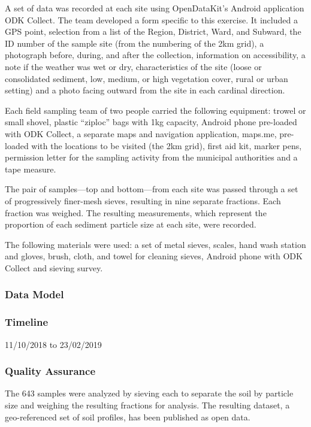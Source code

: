 \documentclass[a4paper,12pt,twoside]{article}
\begin{document}
\begin{multicols}{2}
A set of data was recorded at each site using OpenDataKit’s Android application ODK Collect. The team developed a form specific to this exercise. It included a GPS point, selection from a list of the Region, District, Ward, and Subward, the ID number of the sample site (from the numbering of the 2km 
grid), a photograph before, during, and after the collection, information on accessibility, a note if the weather was wet or dry, characteristics of the site (loose or consolidated sediment, low, medium, or high vegetation cover, rural or urban setting) and a photo facing outward from the site in each cardinal direction.

Each field sampling team of two people carried the following equipment: trowel or small shovel, plastic “ziploc” bags with 1kg capacity, Android phone pre-loaded with ODK Collect, a separate maps and navigation application, maps.me, pre-loaded with the locations to be visited (the 2km grid), first aid kit, marker pens, permission letter for the sampling activity from the municipal authorities and a tape measure.

The pair of samples—top and bottom—from each site was passed through a set of progressively finer-mesh sieves, resulting in nine separate fractions. Each fraction was weighed. The resulting measurements, which represent the proportion of each sediment particle size at each site, were
recorded.

The following materials were used: a set of metal sieves, scales, hand wash station and gloves, brush, cloth, and towel for cleaning sieves, Android phone with ODK Collect and sieving survey.
\end{multicols}

\subsubsection{Data Model}

\subsubsection{Timeline}
11/10/2018 to 23/02/2019

\subsubsection{Quality Assurance}

The 643 samples were analyzed by sieving each to separate the soil by particle size and weighing the resulting fractions for analysis. The resulting dataset, a geo-referenced set of soil profiles, has been published as open data.
\end{document}
